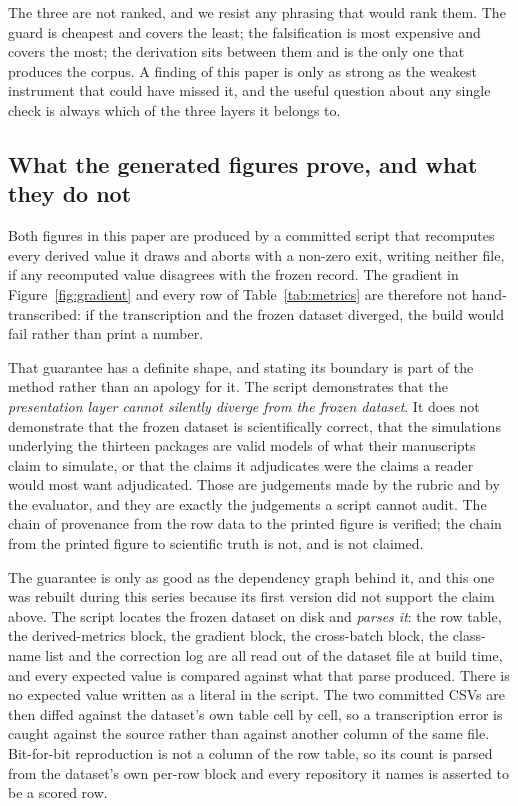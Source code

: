\documentclass[sigconf,review]{acmart}
\begin{document}
The three are not ranked, and we resist any phrasing that would rank them. The
guard is cheapest and covers the least; the falsification is most expensive and
covers the most; the derivation sits between them and is the only one that
produces the corpus. A finding of this paper is only as strong as the weakest
instrument that could have missed it, and the useful question about any single
check is always which of the three layers it belongs to.

\subsection{What the generated figures prove, and what they do not}
\label{sec:method-figures}

Both figures in this paper are produced by a committed script that recomputes
every derived value it draws and aborts with a non-zero exit, writing neither
file, if any recomputed value disagrees with the frozen record. The gradient in
Figure~\ref{fig:gradient} and every row of Table~\ref{tab:metrics} are
therefore not hand-transcribed: if the transcription and the frozen dataset
diverged, the build would fail rather than print a number.

That guarantee has a definite shape, and stating its boundary is part of the
method rather than an apology for it. The script demonstrates that the
\emph{presentation layer cannot silently diverge from the frozen dataset}. It
does not demonstrate that the frozen dataset is scientifically correct, that
the simulations underlying the thirteen packages are valid models of what
their manuscripts claim to simulate, or that the claims it adjudicates were
the claims a reader would most want adjudicated. Those are judgements made by
the rubric and by the evaluator, and they are exactly the judgements a script
cannot audit. The chain of provenance from the row data to the printed figure
is verified; the chain from the printed figure to scientific truth is not, and
is not claimed.

The guarantee is only as good as the dependency graph behind it, and this one
was rebuilt during this series because its first version did not support the
claim above. The script locates the frozen dataset on disk and \emph{parses
it}: the row table, the derived-metrics block, the gradient block, the
cross-batch block, the class-name list and the correction log are all read out
of the dataset file at build time, and every expected value is compared against
what that parse produced. There is no expected value written as a literal in
the script. The two committed CSVs are then diffed against the dataset's own
table cell by cell, so a transcription error is caught against the source
rather than against another column of the same file. Bit-for-bit reproduction
is not a column of the row table, so its count is parsed from the dataset's own
per-row block and every repository it names is asserted to be a scored row.
\end{document}
